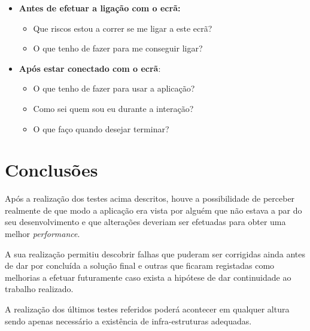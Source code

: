 	\begin{itemize}
	\item \textbf{Antes de efetuar a ligação com o ecrã:}
		\begin{itemize}
		\item Que riscos estou a correr se me ligar a este ecrã?
		\item O que tenho de fazer para me conseguir ligar?
		\end{itemize}
	\item \textbf{Após estar conectado com o ecrã}:
		\begin{itemize}
		\item O que tenho de fazer para usar a aplicação?
		\item Como sei quem sou eu durante a interação?
		\item O que faço quando desejar terminar?
		\end{itemize}
	\end{itemize} 

\section{Conclusões}

	Após a realização dos testes acima descritos, houve a possibilidade de perceber realmente de que modo a aplicação era vista por alguém que não estava a par do seu desenvolvimento e que alterações deveriam ser efetuadas para obter uma melhor \textit{performance}.

	A sua realização permitiu descobrir falhas que puderam ser corrigidas ainda antes de dar por concluída a solução final e outras que ficaram registadas como melhorias a efetuar futuramente caso exista a hipótese de dar continuidade ao trabalho realizado.

	A realização dos últimos testes referidos poderá acontecer em qualquer altura sendo apenas necessário a existência de infra-estruturas adequadas.



	

